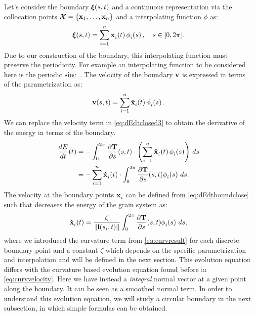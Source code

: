 Let's consider the boundary $\bm{\xi}(s,t)$ and a continuous representation via the collocation points $\vertices = \{\x_1,\dotsc,\x_n\}$ and a interpolating function $\phi$ as:
\begin{equation}
    \vxi(s,t) = \boundarytwo,\quad s \in [0,2\pi].
\end{equation}
Due to our construction of the boundary, this interpolating function must preserve the periodicity. 
For example an interpolating function to be considered here is the periodic $\operatorname{sinc}$~\cite{trefethen2000spectral}. 
The velocity of the boundary $\mathbf{v}$ is expressed in terms of the parametrization as:
\begin{equation}
    \vel(s,t) = \velboundary.
\end{equation}
We can replace the velocity term in \eqref{eq:dEdtclosed3} to obtain the derivative of the energy in terms of the boundary.
\begin{align}
    \dfrac{dE}{dt}(t)
    &= -\int_0^{2\pi} \dTds(s,t) \cdot \left( \velboundary \right)\, ds \nonumber \\
    &= -\sum_{i=1}^{n}  \dotx[i](t) \cdot \int_0^{2\pi}  \dTds(s,t) \phii{i}{s}\, ds.
    \label{eq:dEdtboundclose}
\end{align}
The velocity at the boundary points $\x[i]$ can be defined from \eqref{eq:dEdtboundclose} such that decreases the energy of the grain system as:
\begin{equation}
    \dotx[i](t)= \frac{\zeta}{\norm{\mylvec(s_i,t)}}\int_0^{2\pi}  \dTds(s,t) \phii{i}{s}\, ds,
    \label{eq:coupledvelocity}
\end{equation}
%
where we introduced the curvature term from \eqref{eq:curvresult} for each discrete boundary point and a constant $\zeta$ which depends on the specific parametrization and interpolation and will be defined in the next section. 
This evolution equation differs with the curvature based evolution equation found before in \eqref{eq:curvvelocity}. 
Here we have instead a \emph{integral} normal vector at a given point along the boundary.
It can be seen as a smoothed normal term.
In order to %
understand this evolution equation, we will study a circular boundary in the next subsection, in which simple formulas can be obtained.

